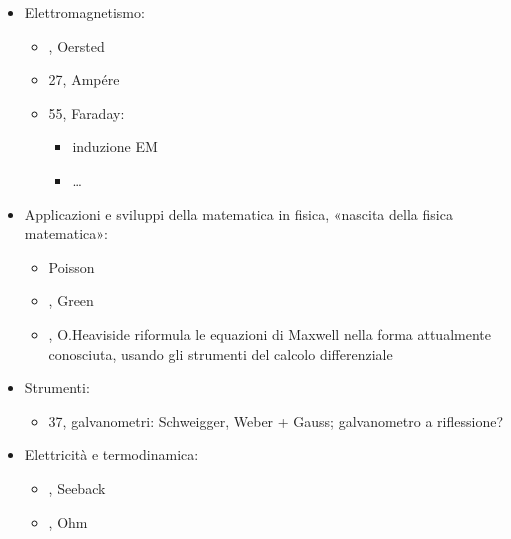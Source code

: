 \documentclass[letterpaper,10pt,italian]{jupyterBook}
\begin{document}
\begin{itemize}
\item {} 
\sphinxAtStartPar
Elettromagnetismo:
\begin{itemize}
\item {} 
, Oersted

\item {} 
\sphinxhyphen{}27, Ampére

\item {} 
\sphinxhyphen{}55, Faraday:
\begin{itemize}
\item {} 
\sphinxAtStartPar
induzione EM

\item {} 
\sphinxAtStartPar
…

\end{itemize}

\end{itemize}

\item {} 
\sphinxAtStartPar
Applicazioni e sviluppi della matematica in fisica, «nascita della fisica matematica»:
\begin{itemize}
\item {} 
\sphinxAtStartPar
Poisson

\item {} 
, Green 

\item {} 
, O.Heaviside riformula le equazioni di Maxwell nella forma attualmente conosciuta, usando gli strumenti del calcolo differenziale

\end{itemize}

\item {} 
\sphinxAtStartPar
Strumenti:
\begin{itemize}
\item {} 
\sphinxhyphen{}37, galvanometri: Schweigger, Weber + Gauss; galvanometro a riflessione?

\end{itemize}

\item {} 
\sphinxAtStartPar
Elettricità e termodinamica:
\begin{itemize}
\item {} 
, Seeback

\item {} 
, Ohm


\end{itemize}
\end{itemize}
\end{document}

